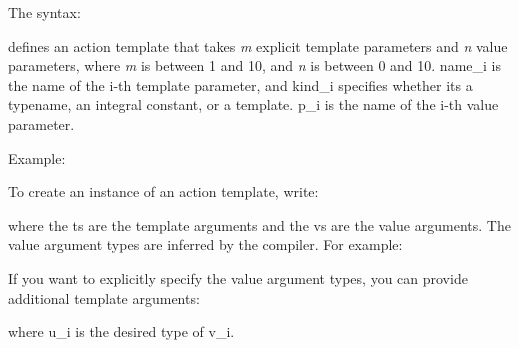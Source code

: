The syntax\+: 
\begin{DoxyCode}{0}
\end{DoxyCode}


defines an action template that takes {\itshape m} explicit template parameters and {\itshape n} value parameters, where {\itshape m} is between 1 and 10, and {\itshape n} is between 0 and 10. {\ttfamily name\+\_\+i} is the name of the i-\/th template parameter, and {\ttfamily kind\+\_\+i} specifies whether it\textquotesingle{}s a {\ttfamily typename}, an integral constant, or a template. {\ttfamily p\+\_\+i} is the name of the i-\/th value parameter.

Example\+: 
\begin{DoxyCode}{0}
\DoxyCodeLine{\}}
\end{DoxyCode}


To create an instance of an action template, write\+: 
\begin{DoxyCode}{0}
\end{DoxyCode}
 where the {\ttfamily t}s are the template arguments and the {\ttfamily v}s are the value arguments. The value argument types are inferred by the compiler. For example\+: 
\begin{DoxyCode}{0}
\end{DoxyCode}


If you want to explicitly specify the value argument types, you can provide additional template arguments\+: 
\begin{DoxyCode}{0}
\end{DoxyCode}
 where {\ttfamily u\+\_\+i} is the desired type of {\ttfamily v\+\_\+i}.


